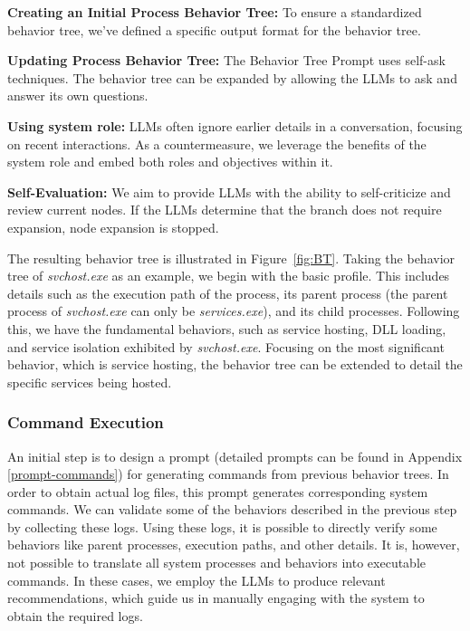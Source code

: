\noindent
{\bf Creating an Initial Process Behavior Tree:} To ensure a standardized behavior tree, we've defined a specific output format for the behavior tree.

\noindent
{\bf Updating Process Behavior Tree:}
The Behavior Tree Prompt uses self-ask techniques. The behavior tree can be expanded by allowing the LLMs to ask and answer its own questions.

\noindent
{\bf Using system role:} 
LLMs often ignore earlier details in a conversation, focusing on recent interactions. As a countermeasure, we leverage the benefits of the system role and embed both roles and objectives within it.

\noindent
{\bf Self-Evaluation:}
We aim to provide LLMs with the ability to self-criticize and review current nodes. If the LLMs determine that the branch does not require expansion, node expansion is stopped.

The resulting behavior tree is illustrated in Figure~\ref{fig:BT}. Taking the behavior tree of \textit{svchost.exe} as an example, we begin with the basic profile. This includes details such as the execution path of the process, its parent process (the parent process of \textit{svchost.exe} can only be \textit{services.exe}), and its child processes. Following this, we have the fundamental behaviors, such as service hosting, DLL loading, and service isolation exhibited by \textit{svchost.exe}. Focusing on the most significant behavior, which is service hosting, the behavior tree can be extended to detail the specific services being hosted. 

\subsubsection{Command Execution}

An initial step is to design a prompt (detailed prompts can be found in Appendix \ref{prompt-commands}) for generating commands from previous behavior trees. In order to obtain actual log files, this prompt generates corresponding system commands. We can validate some of the behaviors described in the previous step by collecting these logs. Using these logs, it is possible to directly verify some behaviors like parent processes, execution paths, and other details. It is, however, not possible to translate all system processes and behaviors into executable commands. In these cases, we employ the LLMs to produce relevant recommendations, which guide us in manually engaging with the system to obtain the required logs.

